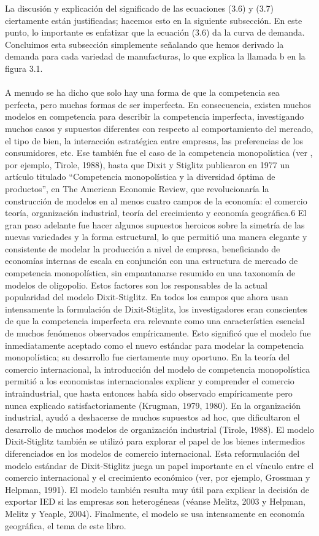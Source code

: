 La discusión y explicación del significado de las ecuaciones (3.6) y (3.7) ciertamente están justificadas; hacemos esto en la siguiente subsección. En este punto, lo importante es enfatizar que la ecuación (3.6) da la curva de demanda. Concluimos esta subsección simplemente señalando que hemos derivado la demanda para cada variedad de manufacturas, lo que explica la llamada b en la figura 3.1.\\\\

A menudo se ha dicho que solo hay una forma de que la competencia sea perfecta, pero muchas formas de ser imperfecta. En consecuencia, existen muchos modelos en competencia para describir la competencia imperfecta, investigando muchos casos y supuestos diferentes con respecto al comportamiento del mercado, el tipo de bien, la interacción estratégica entre empresas, las preferencias de los consumidores, etc. Ese también fue el caso de la competencia monopolística (ver , por ejemplo, Tirole, 1988), hasta que Dixit y Stiglitz publicaron en 1977 un artículo titulado “Competencia monopolística y la diversidad óptima de productos”, en The American Economic Review, que revolucionaría la construcción de modelos en al menos cuatro campos de la economía: el comercio teoría, organización industrial, teoría del crecimiento y economía geográfica.6 El gran paso adelante fue hacer algunos supuestos heroicos sobre la simetría de las nuevas variedades y la forma estructural, lo que permitió una manera elegante y consistente de modelar la producción a nivel de empresa, beneficiando de economías internas de escala en conjunción con una estructura de mercado de competencia monopolística, sin empantanarse resumido en una taxonomía de modelos de oligopolio. Estos factores son los responsables de la actual popularidad del modelo Dixit-Stiglitz. En todos los campos que ahora usan intensamente la formulación de Dixit-Stiglitz, los investigadores eran conscientes de que la competencia imperfecta era relevante como una característica esencial de muchos fenómenos observados empíricamente. Esto significó que el modelo fue inmediatamente aceptado como el nuevo estándar para modelar la competencia monopolística; su desarrollo fue ciertamente muy oportuno. En la teoría del comercio internacional, la introducción del modelo de competencia monopolística permitió a los economistas internacionales explicar y comprender el comercio intraindustrial, que hasta entonces había sido observado empíricamente pero nunca explicado satisfactoriamente (Krugman, 1979, 1980). En la organización industrial, ayudó a deshacerse de muchos supuestos ad hoc, que dificultaron el desarrollo de muchos modelos de organización industrial (Tirole, 1988). El modelo Dixit-Stiglitz también se utilizó para explorar el papel de los bienes intermedios diferenciados en los modelos de comercio internacional. Esta reformulación del modelo estándar de Dixit-Stiglitz juega un papel importante en el vínculo entre el comercio internacional y el crecimiento económico (ver, por ejemplo, Grossman y Helpman, 1991). El modelo también resulta muy útil para explicar la decisión de exportar IED si las empresas son heterogéneas (véanse Melitz, 2003 y Helpman, Melitz y Yeaple, 2004). Finalmente, el modelo se usa intensamente en economía geográfica, el tema de este libro.

